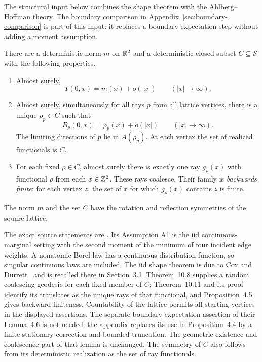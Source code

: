 The structural input below combines the shape theorem with the
Ahlberg--Hoffman theory. The boundary comparison in
Appendix~\ref{sec:boundary-comparison} is part of this input: it replaces
a boundary-expectation step without adding a moment assumption.

\begin{theorem}
\label{thm:structure}
There are a deterministic norm \(m\) on \(\mathbb R^2\) and a deterministic
closed subset \(C\subseteq\mathcal S\) with the following properties.
\begin{enumerate}[label=\textup{(\roman*)}]
\item Almost surely,
\[
 T(0,x)=m(x)+o(|x|)\qquad (|x|\to\infty).
\]
\item Almost surely, simultaneously for all rays \(p\) from all lattice
vertices, there is a unique \(\rho_p\in C\) such that
\begin{equation}\label{eq:busemann-linearity}
 B_p(0,x)=\rho_p(x)+o(|x|)\qquad (|x|\to\infty).
\end{equation}
The limiting directions of \(p\) lie in \(A(\rho_p)\).
At each vertex the set of realized functionals is \(C\).
\item For each fixed \(\rho\in C\), almost surely there is exactly one
ray \(g_\rho(x)\) with functional \(\rho\) from each \(x\in\mathbb Z^2\).
These rays coalesce. Their family is \emph{backwards finite}: for each
vertex \(z\), the set of \(x\) for which \(g_\rho(x)\) contains \(z\)
is finite.
\end{enumerate}
The norm \(m\) and the set \(C\) have the rotation and reflection
symmetries of the square lattice.
\end{theorem}

The exact source statements are
\cite[Assumption A1, Theorems 2.5--2.6 and 10.8--10.11,
and Proposition 4.5]{AhlbergHoffman}.
Its Assumption A1 is the iid continuous-marginal setting with the
second moment of the minimum of four incident edge weights.
A nonatomic Borel law has a continuous distribution function, so
singular continuous laws are included.
The iid shape theorem is due to Cox and Durrett~\cite{CoxDurrett1981}
and is recalled there in Section~3.1.
Theorem~10.8 supplies a random coalescing geodesic for each fixed
member of \(C\); Theorem~10.11 and its proof identify its translates
as the unique rays of that functional, and Proposition~4.5 gives
backward finiteness. Countability of the lattice permits all starting
vertices in the displayed assertions.
The separate boundary-expectation assertion of their Lemma~4.6 is not
needed: the appendix replaces its use in Proposition~4.4 by a finite
stationary correction and bounded truncation. The geometric
existence and coalescence part of that lemma is unchanged.
The symmetry of \(C\) also follows from its deterministic realization
as the set of ray functionals.


